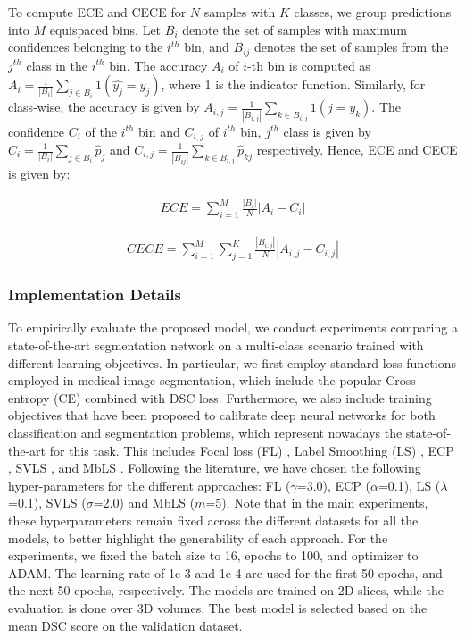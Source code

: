 \documentclass[twocolumn,final,10pt]{elsarticle}
\newcommand{\rev}[1]{{\color{black}#1}}
\begin{document}
\rev{To compute ECE and CECE for $N$ samples with $K$ classes, we group predictions into $M$ equispaced bins.  Let $B_{i}$ denote the set of samples with maximum confidences belonging to the $i^{th}$ bin, and $B_{ij}$ denotes the set of samples from the $j^{th}$ class in the $i^{th}$ bin. The accuracy $A_{i}$ of  $i$-th bin is computed as $A_{i}=\frac{1}{|B_{i}|}\sum_{j \in B_{i}}1(\hat{y_{j}} =y_{j})$, where 1 is the indicator function. Similarly, for class-wise, the accuracy is given by $A_{i,j}=\frac{1}{|B_{i,j}|}\sum_{k \in B_{i,j}}1(j =y_{k})$. The confidence $C_{i}$ of the $i^{th}$ bin and $C_{i,j}$ of $i^{th}$ bin, $j^{th}$ class is given by $C_{i}=\frac{1}{|B_{i}|}\sum_{j \in B_{i}}\hat{p}_{j}$ and $C_{i,j}=\frac{1}{|B_{ij}|}\sum_{k \in B_{i,j}}\hat{p}_{kj}$ respectively. Hence, ECE and CECE is given by: 


\begin{align}
\label{eq:ece}
ECE = \sum_{i=1}^{M}\frac{|B_{i}|}{N}|A_{i} - C_{i}|
\end{align}


\begin{align}
\label{eq:cece}
CECE = \sum_{i=1}^{M}\sum_{j=1}^{K}\frac{|B_{i,j}|}{N}|A_{i,j} - C_{i,j}|
\end{align}
}


\subsubsection{Implementation Details}
\rev{To empirically evaluate the proposed model, we conduct experiments comparing a state-of-the-art segmentation network on a multi-class scenario trained with different learning objectives. In particular, we first employ standard loss functions employed in medical image segmentation, which include the popular Cross-entropy (CE) combined with DSC loss. Furthermore, we also include training objectives that have been proposed to calibrate deep neural networks for both classification and segmentation problems, which represent nowadays the state-of-the-art for this task. This includes Focal loss (FL) \citep{lin2017focal}, Label Smoothing (LS) \citep{szegedy2016rethinking}, ECP  \citep{pereyra2017regularizing}, SVLS \citep{islam2021spatially}, and MbLS \citep{liu2022devil}. Following the literature, we have chosen the following hyper-parameters for the different approaches: FL ($\gamma$=3.0), ECP ($\alpha$=0.1), LS ($\lambda$=0.1), SVLS ($\sigma$=2.0) and MbLS ($m$=5). Note that in the main experiments, these hyperparameters remain fixed across the different datasets for all the models, to better highlight the generability of each approach. For the experiments, we fixed the batch size to 16, epochs to 100, and optimizer to ADAM. The learning rate of 1e-3 and 1e-4 are used for the first 50 epochs, and the next 50 epochs, respectively. The models are trained on 2D slices, while the evaluation is done over 3D volumes. The best model is selected based on the mean DSC score on the validation dataset. }
\end{document}
